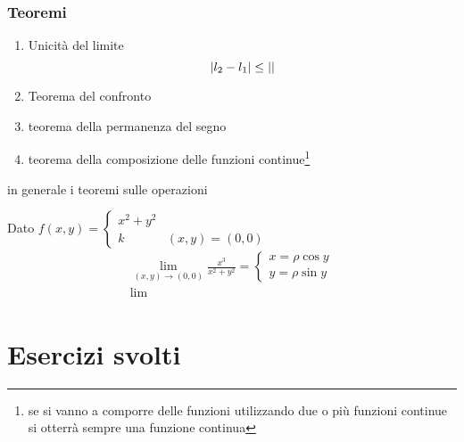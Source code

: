 \subsection{Teoremi}
\begin{enumerate}
\item Unicità del limite
  \begin{equation*}
    \lvert l_2-l_1\rvert\leq \lvert\rvert
  \end{equation*}
\item Teorema del confronto
\item teorema della permanenza del segno
\item teorema della composizione delle funzioni continue\footnote{se si vanno a comporre delle funzioni utilizzando due o più funzioni continue si otterrà sempre una funzione continua}
\end{enumerate}
in generale i teoremi sulle operazioni
\begin{esempio}
  Dato $f(x,y)=\begin{cases} x^2+y^2\\ k&(x,y)=(0,0)\end{cases}$
  \begin{equation*}
    \begin{matrix}
      \lim_{(x,y)\to(0,0)}\frac{x^3}{x^2+y^2}=\begin{cases}
                                              x=\rho \cos y\\
                                              y=\rho \sin y
                                            \end{cases}\\
      \lim_{}
    \end{matrix}
  \end{equation*}
 
  
\end{esempio}
\chapter{Esercizi svolti}
